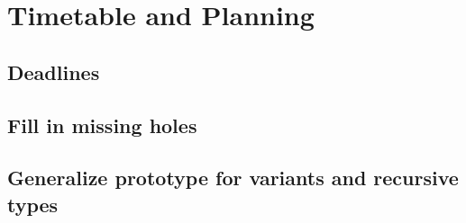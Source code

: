 \documentclass[11pt, letterpaper]{article}
\begin{document}
\section{Timetable and Planning}

\subsection{Deadlines}
\subsection{Fill in missing holes}
\subsection{Generalize prototype for variants and recursive types}

\printbibliography
\end{document}

